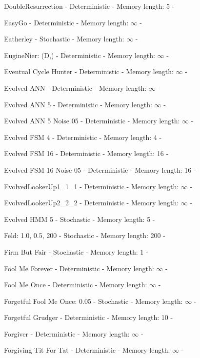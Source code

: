 \item DoubleResurrection - Deterministic - Memory length: 5 - \cite{Eckhart2015}
\item EasyGo - Deterministic - Memory length: \(\infty\) - \cite{Prison1998, Li2011}
\item Eatherley - Stochastic - Memory length: \(\infty\) - \cite{Axelrod1980b}
\item EugineNier: (D,) - Deterministic - Memory length: \(\infty\) - \cite{LessWrong2011}
\item Eventual Cycle Hunter - Deterministic - Memory length: \(\infty\) - \cite{Knight2018}
\item Evolved ANN - Deterministic - Memory length: \(\infty\) - \cite{Knight2018}
\item Evolved ANN 5 - Deterministic - Memory length: \(\infty\) - \cite{Knight2018}
\item Evolved ANN 5 Noise 05 - Deterministic - Memory length: \(\infty\) - \cite{Knight2018}
\item Evolved FSM 4 - Deterministic - Memory length: 4 - \cite{Knight2018}
\item Evolved FSM 16 - Deterministic - Memory length: 16 - \cite{Knight2018}
\item Evolved FSM 16 Noise 05 - Deterministic - Memory length: 16 - \cite{Knight2018}
\item EvolvedLookerUp1\_1\_1 - Deterministic - Memory length: \(\infty\) - \cite{Knight2018}
\item EvolvedLookerUp2\_2\_2 - Deterministic - Memory length: \(\infty\) - \cite{Knight2018}
\item Evolved HMM 5 - Stochastic - Memory length: 5 - \cite{Knight2018}
\item Feld: 1.0, 0.5, 200 - Stochastic - Memory length: 200 - \cite{Axelrod1980}
\item Firm But Fair - Stochastic - Memory length: 1 - \cite{Frean1994}
\item Fool Me Forever - Deterministic - Memory length: \(\infty\) - \cite{Knight2018}
\item Fool Me Once - Deterministic - Memory length: \(\infty\) - \cite{Knight2018}
\item Forgetful Fool Me Once: 0.05 - Stochastic - Memory length: \(\infty\) - \cite{Knight2018}
\item Forgetful Grudger - Deterministic - Memory length: 10 - \cite{Knight2018}
\item Forgiver - Deterministic - Memory length: \(\infty\) - \cite{Knight2018}
\item Forgiving Tit For Tat - Deterministic - Memory length: \(\infty\) - \cite{Knight2018}
